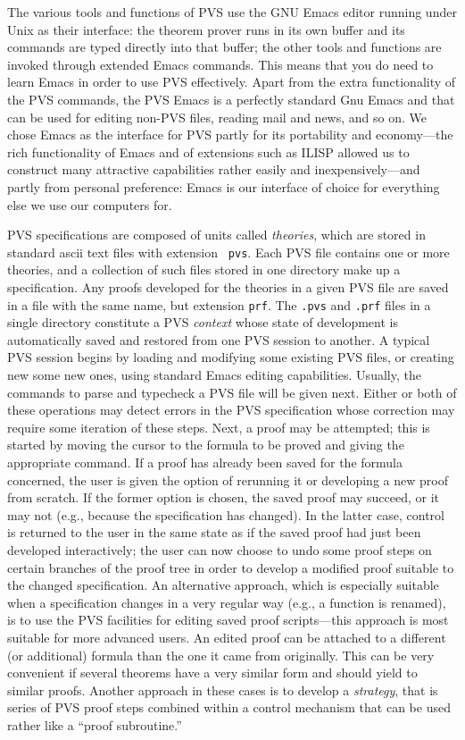{The various tools and functions of PVS use the GNU Emacs editor
running under Unix as their interface: the theorem prover runs in its
own buffer and its commands are typed directly into that buffer; the
other tools and functions are invoked through extended Emacs
commands.  This means that you do need to learn Emacs in order to use
PVS effectively.  Apart from the extra functionality of the PVS
commands, the PVS Emacs is a perfectly standard Gnu Emacs and that
can be used for editing non-PVS files, reading mail and news, and so
on.  We chose Emacs as the interface for PVS partly for its
portability and economy---the rich functionality of Emacs and of
extensions such as ILISP allowed us to construct many attractive
capabilities rather easily and inexpensively---and partly from
personal preference: Emacs is our interface of choice for everything
else we use our computers for.

PVS specifications are composed of units called {\em theories\/},
which are stored in standard ascii text files with extension {\tt
pvs}.  Each PVS file contains one or more theories, and a collection
of such files stored in one directory make up a specification.  Any
proofs developed for the theories in a given PVS file are saved in a
file with the same name, but extension {\tt prf}.  The {\tt .pvs} and
{\tt .prf} files in a single directory constitute a PVS {\em
context\/} whose state of development is automatically saved and
restored from one PVS session to another.  A typical PVS session
begins by loading and modifying some existing PVS files, or creating
new some new ones, using standard Emacs editing capabilities.
Usually, the commands to parse and typecheck a PVS file will be given
next.  Either or both of these operations may detect errors in the
PVS specification whose correction may require some iteration of
these steps.  Next, a proof may be attempted; this is started by
moving the cursor to the formula to be proved and giving the
appropriate command.  If a proof has already been saved for the
formula concerned, the user is given the option of rerunning it or
developing a new proof from scratch.  If the former option is chosen,
the saved proof may succeed, or it may not (e.g., because the
specification has changed).  In the latter case, control is returned
to the user in the same state as if the saved proof had just been
developed interactively; the user can now choose to undo some proof
steps on certain branches of the proof tree in order to develop a
modified proof suitable to the changed specification.  An alternative
approach, which is especially suitable when a specification changes
in a very regular way (e.g., a function is renamed), is to use the PVS
facilities for editing saved proof scripts---this approach is most
suitable for more advanced users.  An edited proof can be attached to
a different (or additional) formula than the one it came from
originally.  This can be very convenient if several theorems have a
very similar form and should yield to similar proofs.  Another
approach in these cases is to develop a {\em strategy\/}, that is
series of PVS proof steps combined within a control mechanism that
can be used rather like a ``proof subroutine.''

}
